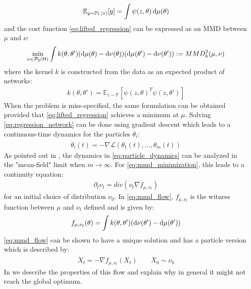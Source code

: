 \[\mathbb{E}_{y\sim \mathbb{P}(.|z)}[y] =  \int \psi(z,\theta) \mathop{}\!\mathrm{d} \mu(\theta)
\] 
and the cost function \cref{eq:lifted_regression} can be expressed as an MMD between $\mu$ and $\nu$:
\begin{align}\label{eq:mmd_minimization}
	\min_{\nu \in \mathcal{P}_2(\Theta)} \int k(\theta,\theta') (\mathop{}\!\mathrm{d}\mu(\theta) -\mathop{}\!\mathrm{d}\nu(\theta))(\mathop{}\!\mathrm{d}\mu(\theta') -\mathop{}\!\mathrm{d}\nu(\theta'))  := MMD_k^2(\mu,\nu)
\end{align} 
where the kernel $k$ is constructed from the data as an expected product of networks:
\begin{align}
	k(\theta,\theta') = \mathbb{E}_{z\sim \mathbb{P}} [\psi(z,\theta)^T\psi(z,\theta')]
\end{align}
When the problem is miss-specified, the same formulation can be obtained provided that \cref{eq:lifted_regression} achieves a minimum at $\mu$. Solving \cref{eq:regression_network} can be done using gradient descent which leads to a continuous-time dynamics for the particles $\theta_i$:
\begin{align}\label{eq:particle_dynamics}
	\dot{\theta}_i(t)= -\nabla \mathcal{L}(\theta_1(t),...,\theta_m(t))
\end{align}  
As pointed out in \cite{chizat2018global,Rotskoff:2019}, the dynamics in \cref{eq:particle_dynamics} can be analyzed in the "mean-field" limit when $m\rightarrow \infty$. For \cref{eq:mmd_minimization}, this leads to a continuity equation:
\begin{align}\label{eq:mmd_flow}
	\partial_t \nu_t = div(\nu_t \nabla f_{\mu,\nu_t})
\end{align}
for an initial choice of distribution $\nu_0$. In \cref{eq:mmd_flow}, $f_{\mu,\nu_t}$ is the witness function between $\mu$ and $\nu_t$ defined and is given by:
\[
f_{\mu,\nu_t}(\theta) =  \int k(\theta,\theta')(\mathop{}\!\mathrm{d} \nu(\theta')-\mathop{}\!\mathrm{d}\mu(\theta') ) 
\]
\cref{eq:mmd_flow} can be shown to have a unique solution and has a particle version which is described by:
\begin{align}\label{eq:particle_equation}
	\dot{X}_t = -\nabla f_{\mu,\nu_t}(X_t) \qquad X_0\sim \nu_0
\end{align}
In  we describe the properties of this flow and explain why in general it might not reach the global optimum.




